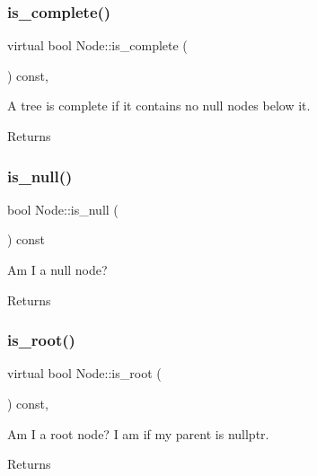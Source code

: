 \subsubsection{\texorpdfstring{is\+\_\+complete()}{is\_complete()}}
{\footnotesize\ttfamily virtual bool Node\+::is\+\_\+complete (\begin{DoxyParamCaption}{ }\end{DoxyParamCaption}) const\hspace{0.3cm}{\ttfamily [inline]}, {\ttfamily [virtual]}}

A tree is complete if it contains no null nodes below it. \begin{DoxyReturn}{Returns}

\end{DoxyReturn}
\mbox{\label{class_node_a895ef3b66f975fbaec1e5866a57afbed}} 
\subsubsection{\texorpdfstring{is\+\_\+null()}{is\_null()}}
{\footnotesize\ttfamily bool Node\+::is\+\_\+null (\begin{DoxyParamCaption}{ }\end{DoxyParamCaption}) const\hspace{0.3cm}{\ttfamily [inline]}}

Am I a null node? \begin{DoxyReturn}{Returns}

\end{DoxyReturn}
\mbox{\label{class_node_ad12a96da2fe796616aa22e20429f41d5}} 
\subsubsection{\texorpdfstring{is\+\_\+root()}{is\_root()}}
{\footnotesize\ttfamily virtual bool Node\+::is\+\_\+root (\begin{DoxyParamCaption}{ }\end{DoxyParamCaption}) const\hspace{0.3cm}{\ttfamily [inline]}, {\ttfamily [virtual]}}

Am I a root node? I am if my parent is nullptr. \begin{DoxyReturn}{Returns}

\end{DoxyReturn}
\mbox{\label{class_node_ac3c263a4e0c734c34aaf62f80f84cd9a}} 
